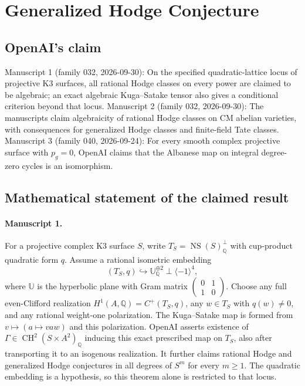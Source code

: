 \documentclass[11pt]{article}
\begin{document}
\section*{Generalized Hodge Conjecture}

\subsection{OpenAI's claim}
Manuscript 1 (family 032, 2026-09-30): On the specified quadratic-lattice locus of projective K3 surfaces, all rational Hodge classes on every power are claimed to be algebraic; an exact algebraic Kuga--Satake tensor also gives a conditional criterion beyond that locus. Manuscript 2 (family 032, 2026-09-30): The manuscripts claim algebraicity of rational Hodge classes on CM abelian varieties, with consequences for generalized Hodge classes and finite-field Tate classes. Manuscript 3 (family 040, 2026-09-24): For every smooth complex projective surface with $p_g=0$, OpenAI claims that the Albanese map on integral degree-zero cycles is an isomorphism.

\subsection{Mathematical statement of the claimed result}
\paragraph{Manuscript 1.}
For a projective complex K3 surface $S$, write $T_S=\operatorname{NS}(S)_{\mathbb Q}^{\perp}$ with cup-product quadratic form $q$. Assume a rational isometric embedding
\[
(T_S,q)\hookrightarrow\mathbb U_{\mathbb Q}^{\oplus2}\perp\langle-1\rangle^4,
\]
where $\mathbb U$ is the hyperbolic plane with Gram matrix $\left(\begin{smallmatrix}0&1\\1&0\end{smallmatrix}\right)$. Choose any full even-Clifford realization $H^1(A,\mathbb Q)=C^+(T_S,q)$, any $w\in T_S$ with $q(w)\ne0$, and any rational weight-one polarization. The Kuga--Satake map is formed from $v\mapsto(a\mapsto vaw)$ and this polarization. OpenAI asserts existence of $\Gamma\in\operatorname{CH}^2(S\times A^2)_{\mathbb Q}$ inducing this exact prescribed map on $T_S$, also after transporting it to an isogenous realization. It further claims rational Hodge and generalized Hodge conjectures in all degrees of $S^m$ for every $m\ge1$. The quadratic embedding is a hypothesis, so this theorem alone is restricted to that locus.
\end{document}
